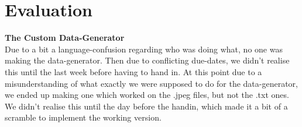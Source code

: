 \section{Evaluation}

\textbf{The Custom Data-Generator}
\\
Due to a bit a language-confusion regarding who was doing what, no one was making the data-generator. Then due to conflicting due-dates, we didn't realise this until the last week before having to hand in. At this point due to a misunderstanding of what exactly we were supposed to do for the data-generator, we ended up making one which worked on the .jpeg files, but not the .txt ones. We didn't realise this until the day before the handin, which made it a bit of a scramble to implement the working version.

